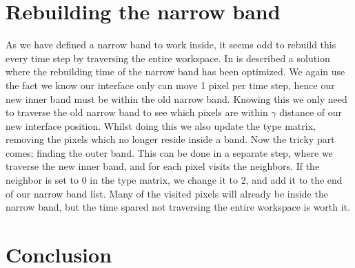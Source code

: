 \section{Rebuilding the narrow band}
As we have defined a narrow band to work inside, it seems odd to
rebuild this every time step by traversing the entire
workspace. In  is described a solution where the
rebuilding time of the narrow band has been optimized. We again use
the fact we know our interface only can move 1 pixel per time step,
hence our new inner band must be within the old narrow band. Knowing
this we only need to traverse the old narrow band to see which pixels
are within $\gamma$ distance of our new interface position. Whilst
doing this we also update the type matrix, removing the pixels which no
longer reside inside a band. Now the tricky part comes; finding the
outer band. This can be done in a separate step, where we traverse the
new inner band, and for each pixel visits the neighbors. If the
neighbor is set to 0 in the type matrix, we change it to 2, and add it
to the end of our narrow band list. Many of the visited pixels will
already be inside the narrow band, but the time spared not traversing
the entire workspace is worth it. 





\section{Conclusion}
